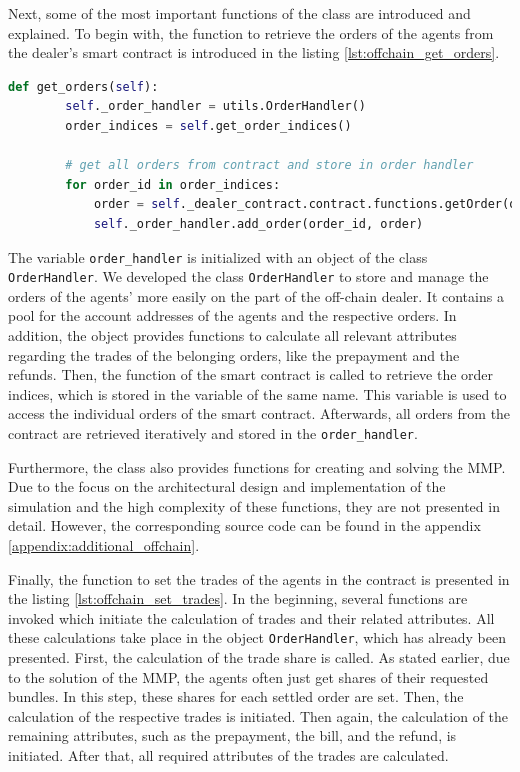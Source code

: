 Next, some of the most important functions of the class are introduced and explained.
To begin with, the function to retrieve the orders of the agents from the dealer's 
smart contract is introduced in the listing \ref{lst:offchain_get_orders}.

\begin{lstlisting}[float=htbp, label=lst:offchain_get_orders, caption=Retrievement of orders, language=Python]
    def get_orders(self):
        self._order_handler = utils.OrderHandler()
        order_indices = self.get_order_indices()

        # get all orders from contract and store in order handler
        for order_id in order_indices:
            order = self._dealer_contract.contract.functions.getOrder(order_id).call()
            self._order_handler.add_order(order_id, order)
\end{lstlisting}

The variable \verb|order_handler| is initialized with an object of the class \verb|OrderHandler|.
We developed the class \verb|OrderHandler| to store and manage the orders of the agents' more easily
on the part of the off-chain dealer.
It contains a pool for the account addresses of the agents and the 
respective orders. In addition, the object provides functions to 
calculate all relevant attributes regarding the trades of the belonging orders, 
like the prepayment and the refunds.
Then, the function of the smart contract is called to retrieve the order indices,
which is stored in the variable of the same name. This variable is used to 
access the individual orders of the smart contract.
Afterwards, all orders from the contract are retrieved iteratively and stored in the \verb|order_handler|.

Furthermore, the class also provides functions for creating and solving the MMP.
Due to the focus on the architectural design and implementation of the simulation and the high complexity
of these functions, they are not presented in detail. However, the corresponding source code can be found in the appendix \ref{appendix:additional_offchain}.

Finally, the function to set the trades of the agents in the contract is presented in the listing \ref{lst:offchain_set_trades}.
In the beginning, several functions are invoked which initiate the calculation of trades and their related attributes.
All these calculations take place in the object \verb|OrderHandler|, which has already been presented.
First, the calculation of the trade share is called. As stated earlier, due to the solution of the 
MMP, the agents often just get shares of their requested bundles. In this step,
these shares for each settled order are set. Then, the calculation of the respective trades is initiated.
Then again, the calculation of the remaining attributes, such as the prepayment, the bill, and the refund,
is initiated. 
After that, all required attributes of the trades are calculated.


